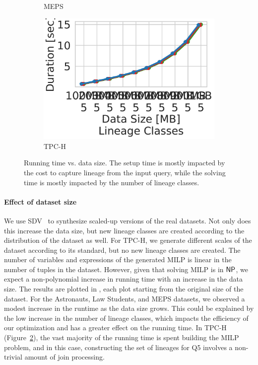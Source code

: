 \begin{figure}[t]
\begin{subfigure}{.35\textwidth}
      \caption{MEPS}
      \label{fig:r23}
    \end{subfigure}
    \begin{subfigure}{.35\textwidth}
      \centering
      \includegraphics[width=.75\linewidth]{figures/tpch_size.pdf}
      \caption{TPC-H}
      \label{fig:r24}
    \end{subfigure}
    
    \caption{Running time vs. data size. The setup time is mostly impacted by the cost to capture lineage from the input query, while the solving time is mostly impacted by the number of lineage classes.}
    \label{fig:time_vs_size}
\end{figure}
\paragraph*{\textbf{Effect of dataset size}}
We use SDV~\cite{SDV} to synthesize scaled-up versions of the real datasets. Not only does this increase the data size, but new lineage classes are created according to the distribution of the dataset as well. For TPC-H, we generate different scales of the dataset according to its standard, but no new lineage classes are created. The number of variables and expressions of the generated MILP is linear in the number of tuples in the dataset. However, given that solving MILP is in ${\sf NP}$, we expect a non-polynomial increase in running time with an increase in the data size. 
The results are plotted in , each plot starting from the original size of the dataset. For the Astronauts, Law Students, and MEPS datasets, we observed a modest increase in the runtime as the data size grows. This could be explained by the low increase in the number of lineage classes, which impacts the efficiency of our optimization and has a greater effect on the running time.
In TPC-H (Figure~\ref{fig:r24}), the vast majority of the running time is spent building the MILP problem, and in this case, constructing the set of lineages for Q5 involves a non-trivial amount of join processing.

